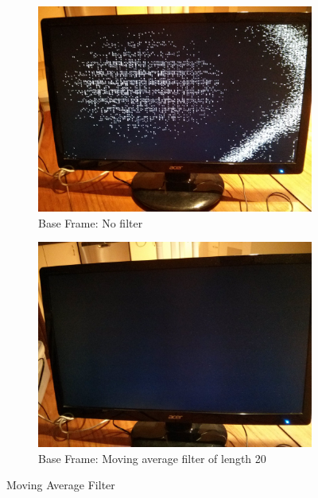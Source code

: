 \documentclass[11pt]{article} %
\begin{document}
\begin{figure}
\centering
\begin{subfigure}{.5\textwidth}
  \centering
  \includegraphics[width=.6\linewidth]{./images/base_no_filter.jpg}
  \caption{Base Frame: No filter}
\end{subfigure}%
\begin{subfigure}{.5\textwidth}
  \centering
  \includegraphics[width=.6\linewidth]{./images/base_filter_20.jpg}
  \caption{Base Frame: Moving average filter of length 20}
\end{subfigure}
\caption{Moving Average Filter}
\label{fig:filter}
\end{figure}
\end{document}
